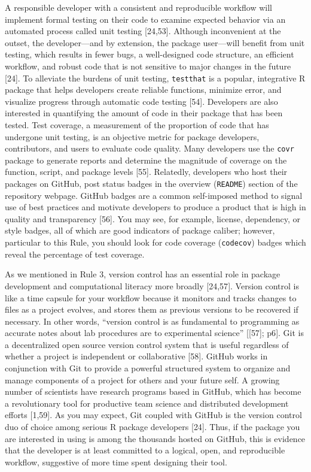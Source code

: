 \documentclass[10pt,letterpaper]{article}
\begin{document}
A responsible developer with a consistent and reproducible workflow will
implement formal testing on their code to examine expected behavior via
an automated process called unit testing {[}24,53{]}. Although
inconvenient at the outset, the developer---and by extension, the
package user---will benefit from unit testing, which results in fewer
bugs, a well-designed code structure, an efficient workflow, and robust
code that is not sensitive to major changes in the future {[}24{]}. To
alleviate the burdens of unit testing, \texttt{testthat} is a popular,
integrative R package that helps developers create reliable functions,
minimize error, and visualize progress through automatic code testing
{[}54{]}. Developers are also interested in quantifying the amount of
code in their package that has been tested. Test coverage, a measurement
of the proportion of code that has undergone unit testing, is an
objective metric for package developers, contributors, and users to
evaluate code quality. Many developers use the \texttt{covr} package to
generate reports and determine the magnitude of coverage on the
function, script, and package levels {[}55{]}. Relatedly, developers who
host their packages on GitHub, post status badges in the overview
(\texttt{README}) section of the repository webpage. GitHub badges are a
common self-imposed method to signal use of best practices and motivate
developers to produce a product that is high in quality and transparency
{[}56{]}. You may see, for example, license, dependency, or style
badges, all of which are good indicators of package caliber; however,
particular to this Rule, you should look for code coverage
(\texttt{codecov}) badges which reveal the percentage of test coverage.

As we mentioned in Rule 3, version control has an essential role in
package development and computational literacy more broadly {[}24,57{]}.
Version control is like a time capsule for your workflow because it
monitors and tracks changes to files as a project evolves, and stores
them as previous versions to be recovered if necessary. In other words,
``version control is as fundamental to programming as accurate notes
about lab procedures are to experimental science'' {[}{[}57{]}; p6{]}.
Git is a decentralized open source version control system that is useful
regardless of whether a project is independent or collaborative
{[}58{]}. GitHub works in conjunction with Git to provide a powerful
structured system to organize and manage components of a project for
others and your future self. A growing number of scientists have
research programs based in GitHub, which has become a revolutionary tool
for productive team science and distributed development efforts
{[}1,59{]}. As you may expect, Git coupled with GitHub is the version
control duo of choice among serious R package developers {[}24{]}. Thus,
if the package you are interested in using is among the thousands hosted
on GitHub, this is evidence that the developer is at least committed to
a logical, open, and reproducible workflow, suggestive of more time
spent designing their tool.
\end{document}
